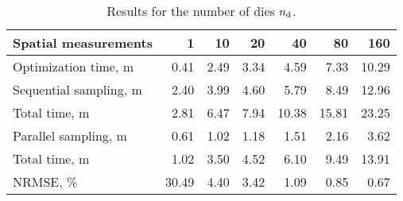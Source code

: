 \begin{table}[h]
  \centering
  \caption{Results for the number of dies ${n_{\text{d}}}$.}
  \begin{tabular*}{1\linewidth}{l@{\hskip 4pt}rrrrrr}
    \toprule
    Spatial measurements   & 1 & 10 & 20 & 40 & 80 & 160 \\
    \midrule
    \midrule
    Optimization time, m   &  0.41 & 2.49 & 3.34 &  4.59 &  7.33 & 10.29 \\
    \midrule
    Sequential sampling, m &  2.40 & 3.99 & 4.60 &  5.79 &  8.49 & 12.96 \\
    Total time, m          &  2.81 & 6.47 & 7.94 & 10.38 & 15.81 & 23.25 \\
    \midrule
    Parallel sampling, m   &  0.61 & 1.02 & 1.18 &  1.51 &  2.16 &  3.62 \\
    Total time, m          &  1.02 & 3.50 & 4.52 &  6.10 &  9.49 & 13.91 \\
    \midrule
    NRMSE, \%              & 30.49 & 4.40 & 3.42 &  1.09 &  0.85 &  0.67 \\
    \bottomrule
  \end{tabular*}
  \vspace{-1em}
\end{table}
